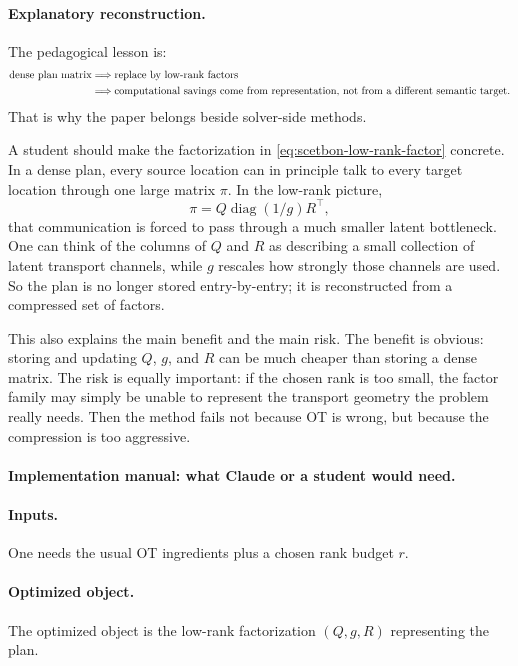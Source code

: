 \documentclass[11pt]{report}
\newcommand{\diag}{\operatorname{diag}}
\begin{document}
\paragraph{Explanatory reconstruction.}
The pedagogical lesson is:
\begin{align}
\text{dense plan matrix}
&\Longrightarrow
\text{replace by low-rank factors}
\notag\\
&\Longrightarrow
\text{computational savings come from representation, not from a different semantic target}.
\label{eq:scetbon-logic}
\end{align}
That is why the paper belongs beside solver-side methods.

A student should make the factorization in \eqref{eq:scetbon-low-rank-factor}
concrete.  In a dense plan, every source location can in principle talk to every
target location through one large matrix $\pi$.  In the low-rank picture,
\begin{equation}
\pi = Q\diag(1/g)R^{\top},
\end{equation}
that communication is forced to pass through a much smaller latent bottleneck.  One
can think of the columns of $Q$ and $R$ as describing a small collection of latent
transport channels, while $g$ rescales how strongly those channels are used.  So the
plan is no longer stored entry-by-entry; it is reconstructed from a compressed set of
factors.

This also explains the main benefit and the main risk.  The benefit is obvious:
storing and updating $Q$, $g$, and $R$ can be much cheaper than storing a dense
matrix.  The risk is equally important: if the chosen rank is too small, the factor
family may simply be unable to represent the transport geometry the problem really
needs.  Then the method fails not because OT is wrong, but because the compression is
too aggressive.

\paragraph{Implementation manual: what Claude or a student would need.}
\paragraph{Inputs.}
One needs the usual OT ingredients plus a chosen rank budget $r$.

\paragraph{Optimized object.}
The optimized object is the low-rank factorization $(Q,g,R)$ representing the plan.
\end{document}
